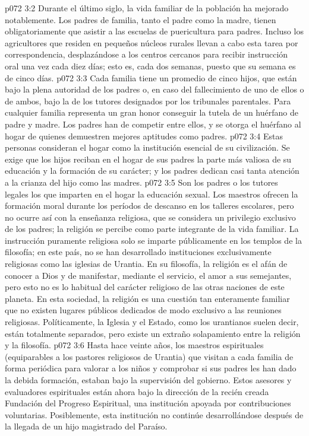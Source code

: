 \vs p072 3:2 Durante el último siglo, la vida familiar de la población ha mejorado notablemente. Los padres de familia, tanto el padre como la madre, tienen obligatoriamente que asistir a las escuelas de puericultura para padres. Incluso los agricultores que residen en pequeños núcleos rurales llevan a cabo esta tarea por correspondencia, desplazándose a los centros cercanos para recibir instrucción oral una vez cada diez días; esto es, cada dos semanas, puesto que su semana es de cinco días.
\vs p072 3:3 Cada familia tiene un promedio de cinco hijos, que están bajo la plena autoridad de los padres o, en caso del fallecimiento de uno de ellos o de ambos, bajo la de los tutores designados por los tribunales parentales. Para cualquier familia representa un gran honor conseguir la tutela de un huérfano de padre y madre. Los padres han de competir entre ellos, y se otorga el huérfano al hogar de quienes demuestren mejores aptitudes como padres.
\vs p072 3:4 \pc Estas personas consideran el hogar como la institución esencial de su civilización. Se exige que los hijos reciban en el hogar de sus padres la parte más valiosa de su educación y la formación de su carácter; y los padres dedican casi tanta atención a la crianza del hijo como las madres.
\vs p072 3:5 Son los padres o los tutores legales los que imparten en el hogar la educación sexual. Los maestros ofrecen la formación moral durante los períodos de descanso en los talleres escolares, pero no ocurre así con la enseñanza religiosa, que se considera un privilegio exclusivo de los padres; la religión se percibe como parte integrante de la vida familiar. La instrucción puramente religiosa solo se imparte públicamente en los templos de la filosofía; en este país, no se han desarrollado instituciones exclusivamente religiosas como las iglesias de Urantia. En su filosofía, la religión es el afán de conocer a Dios y de manifestar, mediante el servicio, el amor a sus semejantes, pero esto no es lo habitual del carácter religioso de las otras naciones de este planeta. En esta sociedad, la religión es una cuestión tan enteramente familiar que no existen lugares públicos dedicados de modo exclusivo a las reuniones religiosas. Políticamente, la Iglesia y el Estado, como los urantianos suelen decir, están totalmente separados, pero existe un extraño solapamiento entre la religión y la filosofía.
\vs p072 3:6 Hasta hace veinte años, los maestros espirituales (equiparables a los pastores religiosos de Urantia) que visitan a cada familia de forma periódica para valorar a los niños y comprobar si sus padres les han dado la debida formación, estaban bajo la supervisión del gobierno. Estos asesores y evaluadores espirituales están ahora bajo la dirección de la recién creada Fundación del Progreso Espiritual, una institución apoyada por contribuciones voluntarias. Posiblemente, esta institución no continúe desarrollándose después de la llegada de un hijo magistrado del Paraíso.

